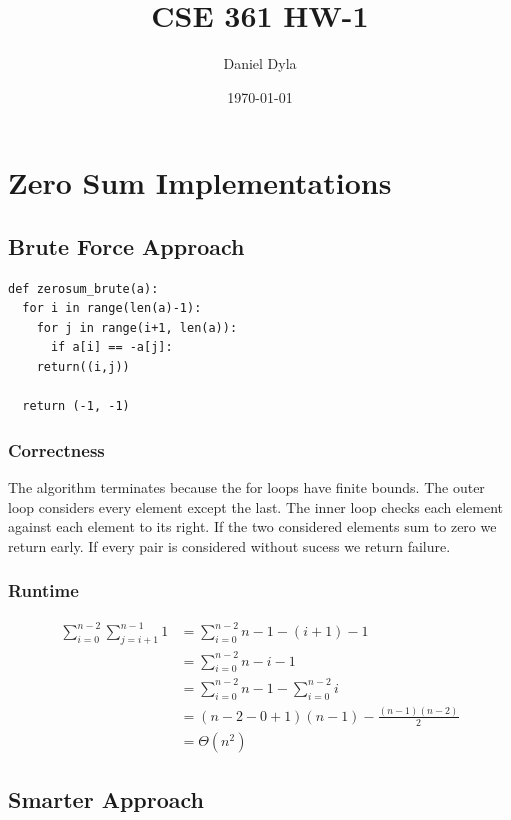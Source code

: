 \documentclass[11pt]{article}
\author{Daniel Dyla}
\date{\today}
\title{CSE 361 HW-1}
\begin{document}
\maketitle
\tableofcontents


\section{Zero Sum Implementations}
\label{sec-1}
\subsection{Brute Force Approach}
\label{sec-1-1}

\lstset{language=Python,label= ,caption= ,numbers=none}
\begin{lstlisting}
def zerosum_brute(a):
  for i in range(len(a)-1):
    for j in range(i+1, len(a)):
      if a[i] == -a[j]:
	return((i,j))

  return (-1, -1)
\end{lstlisting}

\subsubsection{Correctness}
\label{sec-1-1-1}

The algorithm terminates because the for loops have finite bounds. The
outer loop considers every element except the last. The inner loop
checks each element against each element to its right. If the two
considered elements sum to zero we return early. If every pair is
considered without sucess we return failure.

\subsubsection{Runtime}
\label{sec-1-1-2}

\begin{align}
\sum_{i=0}^{n-2} \sum_{j=i+1}^{n-1} 1 &= \sum_{i=0}^{n-2} n - 1 - (i + 1) -1 \\
&= \sum_{i=0}^{n-2} n - i - 1 \\
&= \sum_{i=0}^{n-2} n - 1 - \sum_{i=0}^{n-2} i \\
&= (n - 2 - 0 + 1)(n-1) - \frac{(n-1)(n-2)}{2} \\
&= \Theta (n^2)
\end{align}

\subsection{Smarter Approach}
\label{sec-1-2}
\end{document}
